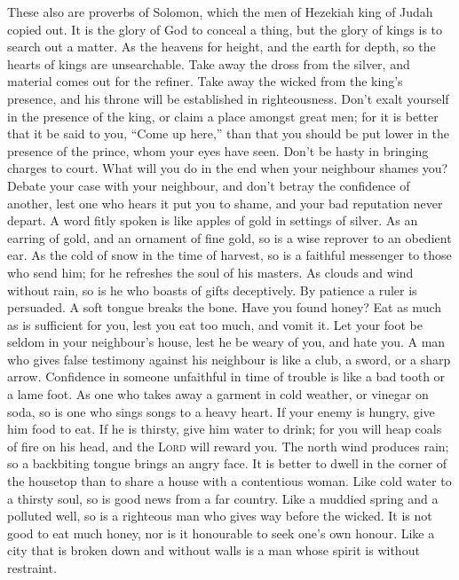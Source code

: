  These also are proverbs of Solomon, which the men of
Hezekiah king of Judah copied out.  It is the glory of God
to conceal a thing, but the glory of kings is to search out a matter.
 As the heavens for height, and the earth for depth, so
the hearts of kings are unsearchable.  Take away the dross
from the silver, and material comes out for the refiner. 
Take away the wicked from the king's presence, and his throne will be
established in righteousness.  Don't exalt yourself in the
presence of the king, or claim a place amongst great men; 
for it is better that it be said to you, ``Come up here,'' than that you
should be put lower in the presence of the prince, whom your eyes have
seen.  Don't be hasty in bringing charges to court. What
will you do in the end when your neighbour shames you? 
Debate your case with your neighbour, and don't betray the confidence of
another,  lest one who hears it put you to shame, and
your bad reputation never depart.  A word fitly spoken is
like apples of gold in settings of silver.  As an earring
of gold, and an ornament of fine gold, so is a wise reprover to an
obedient ear.  As the cold of snow in the time of
harvest, so is a faithful messenger to those who send him; for he
refreshes the soul of his masters.  As clouds and wind
without rain, so is he who boasts of gifts deceptively. 
By patience a ruler is persuaded. A soft tongue breaks the bone.
 Have you found honey? Eat as much as is sufficient for
you, lest you eat too much, and vomit it.  Let your foot
be seldom in your neighbour's house, lest he be weary of you, and hate
you.  A man who gives false testimony against his
neighbour is like a club, a sword, or a sharp arrow. 
Confidence in someone unfaithful in time of trouble is like a bad tooth
or a lame foot.  As one who takes away a garment in cold
weather, or vinegar on soda, so is one who sings songs to a heavy heart.
 If your enemy is hungry, give him food to eat. If he is
thirsty, give him water to drink;  for you will heap
coals of fire on his head, and the \textsc{Lord} will reward you.
 The north wind produces rain; so a backbiting tongue
brings an angry face.  It is better to dwell in the
corner of the housetop than to share a house with a contentious woman.
 Like cold water to a thirsty soul, so is good news from
a far country.  Like a muddied spring and a polluted
well, so is a righteous man who gives way before the wicked.
 It is not good to eat much honey, nor is it honourable
to seek one's own honour.  Like a city that is broken
down and without walls is a man whose spirit is without restraint.

